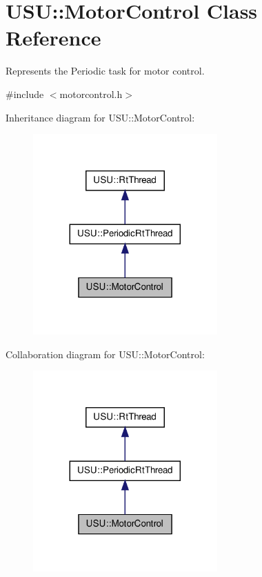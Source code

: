 \hypertarget{class_u_s_u_1_1_motor_control}{\section{\-U\-S\-U\-:\-:\-Motor\-Control \-Class \-Reference}
\label{class_u_s_u_1_1_motor_control}
}


\-Represents the \-Periodic task for motor control.  




{\ttfamily \#include $<$motorcontrol.\-h$>$}



\-Inheritance diagram for \-U\-S\-U\-:\-:\-Motor\-Control\-:\nopagebreak
\begin{figure}[H]
\begin{center}
\leavevmode
\includegraphics[width=200pt]{class_u_s_u_1_1_motor_control__inherit__graph}
\end{center}
\end{figure}


\-Collaboration diagram for \-U\-S\-U\-:\-:\-Motor\-Control\-:\nopagebreak
\begin{figure}[H]
\begin{center}
\leavevmode
\includegraphics[width=200pt]{class_u_s_u_1_1_motor_control__coll__graph}
\end{center}
\end{figure}
